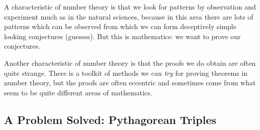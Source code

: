 \documentclass[12pt]{article}
\begin{document}
A characteristic of number theory is that we look for patterns by observation and experiment much as in the natural sciences, because in this area there are lots of patterns which can be observed from which we can form deceptively simple looking conjectures (guesses).   But this is mathematics:  we want to prove our conjectures.

Another characteristic of number theory is that the proofs we do obtain are often quite strange.  There is a toolkit of methods we can {\em try\/} for proving theorems in number theory, but the proofs are often eccentric and sometimes come from what seem to be quite different areas of mathematics.

\subsection{A Problem Solved:  Pythagorean Triples}
\end{document}
